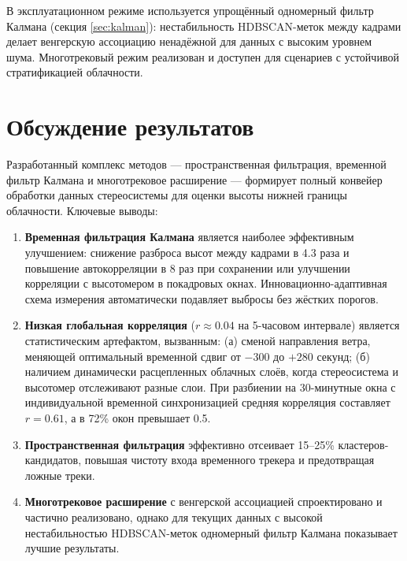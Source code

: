 \documentclass[11pt]{article} %
\begin{document}
	В эксплуатационном режиме используется упрощённый одномерный фильтр Калмана (секция \ref{sec:kalman}): нестабильность HDBSCAN-меток между кадрами делает венгерскую ассоциацию ненадёжной для данных с высоким уровнем шума. Многотрековый режим реализован и доступен для сценариев с устойчивой стратификацией облачности.
	
	\pagebreak
	
	\section{Обсуждение результатов}
	\vspace{3mm}\hspace{5mm}
	
	Разработанный комплекс методов — пространственная фильтрация, временной фильтр Калмана и многотрековое расширение — формирует полный конвейер обработки данных стереосистемы для оценки высоты нижней границы облачности. Ключевые выводы:
	
	\begin{enumerate}
		\item \textbf{Временная фильтрация Калмана} является наиболее эффективным улучшением: снижение разброса высот между кадрами в 4.3 раза и повышение автокорреляции в 8 раз при сохранении или улучшении корреляции с высотомером в покадровых окнах. Инновационно-адаптивная схема измерения автоматически подавляет выбросы без жёстких порогов.
		
		\item \textbf{Низкая глобальная корреляция} ($r \approx 0.04$ на 5-часовом интервале) является статистическим артефактом, вызванным: (а) сменой направления ветра, меняющей оптимальный временной сдвиг от $-300$ до $+280$ секунд; (б) наличием динамически расцепленных облачных слоёв, когда стереосистема и высотомер отслеживают разные слои. При разбиении на 30-минутные окна с индивидуальной временной синхронизацией средняя корреляция составляет $r = 0.61$, а в 72\% окон превышает 0.5.
		
		\item \textbf{Пространственная фильтрация} эффективно отсеивает 15--25\% кластеров-кандидатов, повышая чистоту входа временного трекера и предотвращая ложные треки.
		
		\item \textbf{Многотрековое расширение} с венгерской ассоциацией спроектировано и частично реализовано, однако для текущих данных с высокой нестабильностью HDBSCAN-меток одномерный фильтр Калмана показывает лучшие результаты.
	\end{enumerate}
	
\end{document}

